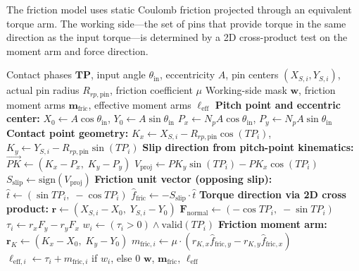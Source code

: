 \documentclass{article}
\begin{document}
The friction model uses static Coulomb friction projected through an equivalent torque arm. The working side---the set of pins that provide torque in the same direction as the input torque---is determined by a 2D cross-product test on the moment arm and force direction.

\begin{algorithm}[t]
\caption{Friction and Working-Side Determination}\label{alg:friction}
\begin{algorithmic}[1]
\Require Contact phases $\mathbf{TP}$, input angle $\theta_\text{in}$, eccentricity $A$, pin centers $(X_{S,i}, Y_{S,i})$, actual pin radius $R_{rp,\text{pin}}$, friction coefficient $\mu$
\Ensure Working-side mask $\mathbf{w}$, friction moment arms $\mathbf{m}_\text{fric}$, effective moment arms $\boldsymbol{\ell}_\text{eff}$
\Statex
\State \textbf{Pitch point and eccentric center:}
\State $X_0 \gets A\cos\theta_\text{in}$, \quad $Y_0 \gets A\sin\theta_\text{in}$ 
\State $P_x \gets N_p A\cos\theta_\text{in}$, \quad $P_y \gets N_p A\sin\theta_\text{in}$ 
\Statex
{}
    \State \textbf{Contact point geometry:}
    \State $K_x \gets X_{S,i} - R_{rp,\text{pin}}\cos(TP_i)$, \quad $K_y \gets Y_{S,i} - R_{rp,\text{pin}}\sin(TP_i)$
    \Statex
    \State \textbf{Slip direction from pitch-point kinematics:}
    \State $\overrightarrow{PK} \gets (K_x - P_x,\; K_y - P_y)$ 
    \State $V_\text{proj} \gets PK_y \sin(TP_i) - PK_x \cos(TP_i)$
    \State $S_\text{slip} \gets \text{sign}(V_\text{proj})$ 
    \Statex
    \State \textbf{Friction unit vector (opposing slip):}
    \State $\hat{t} \gets (\sin TP_i,\; -\cos TP_i)$ 
    \State $\hat{f}_\text{fric} \gets -S_\text{slip} \cdot \hat{t}$ 
    \Statex
    \State \textbf{Torque direction via 2D cross product:}
    \State $\mathbf{r} \gets (X_{S,i} - X_0,\; Y_{S,i} - Y_0)$ 
    \State $\mathbf{F}_\text{normal} \gets (-\cos TP_i,\; -\sin TP_i)$ 
    \State $\tau_i \gets r_x F_y - r_y F_x$ 
    \State $w_i \gets (\tau_i > 0) \wedge \text{valid}(TP_i)$ 
    \Statex
    \State \textbf{Friction moment arm:}
    \State $\mathbf{r}_K \gets (K_x - X_0,\; K_y - Y_0)$ 
    \State $m_{\text{fric},i} \gets \mu \cdot (r_{K,x} \hat{f}_{\text{fric},y} - r_{K,y} \hat{f}_{\text{fric},x})$
    \State $\ell_{\text{eff},i} \gets \tau_i + m_{\text{fric},i}$ if $w_i$, else $0$
\EndFor
\State \Return $\mathbf{w}$, $\mathbf{m}_\text{fric}$, $\boldsymbol{\ell}_\text{eff}$
\end{algorithmic}
\end{algorithm}
\end{document}
